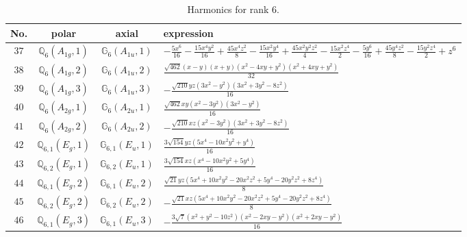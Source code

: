 \documentclass[fleqn,8pt,landscape]{jsarticle}
\begin{document}
\begin{table}[ht!]
\begin{center}
\caption{Harmonics for rank 6.}
\renewcommand{\arraystretch}{1.3}
\begin{tabular}{cccl} \hline \hline
No. & polar & axial & expression \\ \hline
$ 37 $ & $ \mathbb{Q}_{6}(A_{1g},1) $ & $ \mathbb{G}_{6}(A_{1u},1) $ & $ - \frac{5 x^{6}}{16} - \frac{15 x^{4} y^{2}}{16} + \frac{45 x^{4} z^{2}}{8} - \frac{15 x^{2} y^{4}}{16} + \frac{45 x^{2} y^{2} z^{2}}{4} - \frac{15 x^{2} z^{4}}{2} - \frac{5 y^{6}}{16} + \frac{45 y^{4} z^{2}}{8} - \frac{15 y^{2} z^{4}}{2} + z^{6} $ \\
$ 38 $ & $ \mathbb{Q}_{6}(A_{1g},2) $ & $ \mathbb{G}_{6}(A_{1u},2) $ & $ \frac{\sqrt{462} \left(x - y\right) \left(x + y\right) \left(x^{2} - 4 x y + y^{2}\right) \left(x^{2} + 4 x y + y^{2}\right)}{32} $ \\
$ 39 $ & $ \mathbb{Q}_{6}(A_{1g},3) $ & $ \mathbb{G}_{6}(A_{1u},3) $ & $ - \frac{\sqrt{210} y z \left(3 x^{2} - y^{2}\right) \left(3 x^{2} + 3 y^{2} - 8 z^{2}\right)}{16} $ \\
$ 40 $ & $ \mathbb{Q}_{6}(A_{2g},1) $ & $ \mathbb{G}_{6}(A_{2u},1) $ & $ \frac{\sqrt{462} x y \left(x^{2} - 3 y^{2}\right) \left(3 x^{2} - y^{2}\right)}{16} $ \\
$ 41 $ & $ \mathbb{Q}_{6}(A_{2g},2) $ & $ \mathbb{G}_{6}(A_{2u},2) $ & $ - \frac{\sqrt{210} x z \left(x^{2} - 3 y^{2}\right) \left(3 x^{2} + 3 y^{2} - 8 z^{2}\right)}{16} $ \\
$ 42 $ & $ \mathbb{Q}_{6,1}(E_{g},1) $ & $ \mathbb{G}_{6,1}(E_{u},1) $ & $ \frac{3 \sqrt{154} y z \left(5 x^{4} - 10 x^{2} y^{2} + y^{4}\right)}{16} $ \\
$ 43 $ & $ \mathbb{Q}_{6,2}(E_{g},1) $ & $ \mathbb{G}_{6,2}(E_{u},1) $ & $ \frac{3 \sqrt{154} x z \left(x^{4} - 10 x^{2} y^{2} + 5 y^{4}\right)}{16} $ \\
$ 44 $ & $ \mathbb{Q}_{6,1}(E_{g},2) $ & $ \mathbb{G}_{6,1}(E_{u},2) $ & $ \frac{\sqrt{21} y z \left(5 x^{4} + 10 x^{2} y^{2} - 20 x^{2} z^{2} + 5 y^{4} - 20 y^{2} z^{2} + 8 z^{4}\right)}{8} $ \\
$ 45 $ & $ \mathbb{Q}_{6,2}(E_{g},2) $ & $ \mathbb{G}_{6,2}(E_{u},2) $ & $ - \frac{\sqrt{21} x z \left(5 x^{4} + 10 x^{2} y^{2} - 20 x^{2} z^{2} + 5 y^{4} - 20 y^{2} z^{2} + 8 z^{4}\right)}{8} $ \\
$ 46 $ & $ \mathbb{Q}_{6,1}(E_{g},3) $ & $ \mathbb{G}_{6,1}(E_{u},3) $ & $ - \frac{3 \sqrt{7} \left(x^{2} + y^{2} - 10 z^{2}\right) \left(x^{2} - 2 x y - y^{2}\right) \left(x^{2} + 2 x y - y^{2}\right)}{16} $ \\

\end{tabular}
\end{center}
\end{table}
\end{document}
